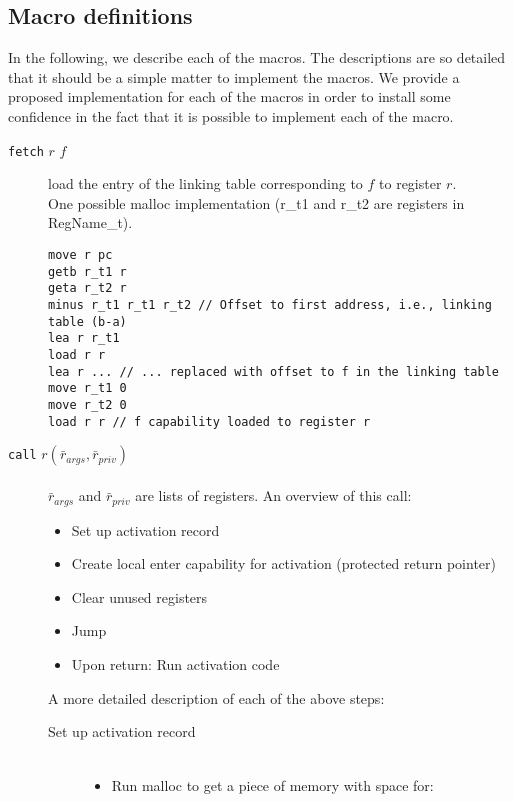\documentclass[a4paper]{article}
\newcommand{\forcenewline}{$\phantom{v}$\\}
\newcommand{\var}[1]{\mathit{#1}}
\begin{document}
              \subsection{Macro definitions}
In the following, we describe each of the macros. The descriptions are so detailed that it should be a simple matter to implement the macros. We provide a proposed implementation for each of the macros in order to install some confidence in the fact that it is possible to implement each of the macro.
              \begin{description}
              \item[\texttt{fetch} $r$ $f$] load the entry of the linking table corresponding to $f$ to register $r$.\\
One possible malloc implementation (r\_t1 and r\_t2 are registers in RegName\_t).
\begin{lstlisting}
move r pc
getb r_t1 r
geta r_t2 r
minus r_t1 r_t1 r_t2 // Offset to first address, i.e., linking table (b-a)
lea r r_t1
load r r
lea r ... // ... replaced with offset to f in the linking table
move r_t1 0
move r_t2 0
load r r // f capability loaded to register r
\end{lstlisting}
              \item[\texttt{call} $r(\bar{r}_{\var{args}},\bar{r}_{\var{priv}})$] \forcenewline
                $\bar{r}_{\var{args}}$ and $\bar{r}_{\var{priv}}$ are lists of registers. An overview of this call:
                \begin{itemize}
                \item Set up activation record
                \item Create local enter capability for activation (protected return pointer)
                \item Clear unused registers
                \item Jump
                \item Upon return: Run activation code
                \end{itemize}
                A more detailed description of each of the above steps:
                \begin{description}
                \item [Set up activation record]\forcenewline
                  \begin{itemize}
                  \item Run malloc to get a piece of memory with space for:
                    \begin{itemize}

\end{itemize}
\end{itemize}
\end{description}
\end{description}
\end{document}
